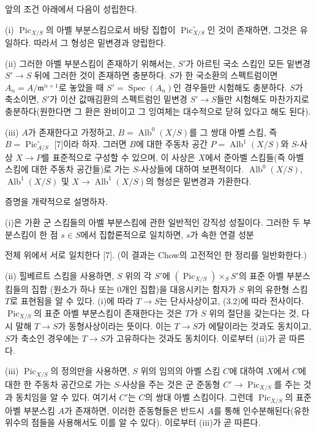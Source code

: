  앞의 조건 아래에서 다음이 성립한다.

\noindent(i) $\operatorname{Pic}_{X/S}$의 아벨 부분스킴으로서 바탕 집합이
$\operatorname{Pic}_{X/S}^\circ$인 것이 존재하면, 그것은 유일하다. 따라서
그 형성은 밑변경과 양립한다.

\noindent(ii) 그러한 아벨 부분스킴이 존재하기 위해서는, $S'$가 아르틴
국소 스킴인 모든 밑변경 $S'\longrightarrow S$ 뒤에 그러한 것이 존재하면
충분하다. $S$가 한 국소환의 스펙트럼이면
$A_n=A/\mathfrak m^{n+1}$로 놓았을 때
$S'=\operatorname{Spec}(A_n)$인 경우들만 시험해도 충분하다. $S$가
축소이면, $S'$가 이산 값매김환의 스펙트럼인 밑변경
$S'\longrightarrow S$들만 시험해도 마찬가지로 충분하다(원한다면 그 환은
완비이고 그 잉여체는 대수적으로 닫혀 있다고 해도 된다).

\noindent(iii) $A$가 존재한다고 가정하고,
$B=\operatorname{Alb}^0(X/S)$를 그 쌍대 아벨 스킴, 즉
$B=\operatorname{Pic}_{A/S}^\circ$ [7]이라 하자. 그러면 $B$에 대한
주동차 공간 $P=\operatorname{Alb}^1(X/S)$와 $S$-사상
$X\longrightarrow P$를 표준적으로 구성할 수 있으며, 이 사상은 $X$에서
준아벨 스킴들(즉 아벨 스킴에 대한 주동차 공간들)로 가는 $S$-사상들에
대하여 보편적이다. $\operatorname{Alb}^0(X/S)$,
$\operatorname{Alb}^1(X/S)$ 및
$X\longrightarrow\operatorname{Alb}^1(X/S)$의 형성은 밑변경과 가환한다.

증명을 개략적으로 설명하자.

(i)은 가환 군 스킴들의 아벨 부분스킴에 관한 일반적인 강직성 성질이다.
그러한 두 부분스킴이 한 점 $s\in S$에서 집합론적으로 일치하면, $s$가
속한 연결 성분

전체 위에서 서로 일치한다 [7]. (이 결과는 Chow의 고전적인 한 정리를
일반화한다.)

(ii) 힐베르트 스킴을 사용하면, $S$ 위의 각 $S'$에
$(\operatorname{Pic}_{X/S})\times_S S'$의 표준 아벨 부분스킴들의 집합
(원소가 하나 또는 0개인 집합)을 대응시키는 함자가 $S$ 위의 유한형 스킴
$T$로 표현됨을 알 수 있다. (i)에 따라 $T\longrightarrow S$는
단사사상이고, (3.2)에 따라 전사이다. $\operatorname{Pic}_{X/S}$의 표준
아벨 부분스킴이 존재한다는 것은 $T$가 $S$ 위의 절단을 갖는다는 것, 다시
말해 $T\longrightarrow S$가 동형사상이라는 뜻이다. 이는
$T\longrightarrow S$가 에탈이라는 것과도 동치이고, $S$가 축소인
경우에는 $T\longrightarrow S$가 고유하다는 것과도 동치이다. 이로부터
(ii)가 곧 따른다.

(iii) $\operatorname{Pic}_{X/S}$의 정의만을 사용하면, $S$ 위의 임의의
아벨 스킴 $C$에 대하여 $X$에서 $C$에 대한 한 주동차 공간으로 가는
$S$-사상을 주는 것은 군 준동형
$C'\longrightarrow\operatorname{Pic}_{X/S}$를 주는 것과 동치임을 알 수
있다. 여기서 $C'$는 $C$의 쌍대 아벨 스킴이다. 그런데
$\operatorname{Pic}_{X/S}$의 표준 아벨 부분스킴 $A$가 존재하면, 이러한
준동형들은 반드시 $A$를 통해 인수분해된다(유한 위수의 점들을 사용해서도
이를 알 수 있다). 이로부터 (iii)가 곧 따른다.

